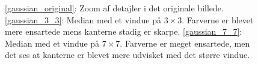 {\begin{figure}[!h]
    \centering
    \hspace{1em}
    \hspace{1em}
    \caption[]{\ref{gaussian_original}: Zoom af detajler i det originale
    billede. \ref{gaussian_3_3}: Median med et vindue på $3\times{}3$.
    Farverne er blevet mere ensartede mens kanterne stadig er skarpe.
    \ref{gaussian_7_7}: Median med et vindue på $7\times{}7$. Farverne er
    meget ensartede, men det ses at kanterne er blevet mere udvisket med
    det større vindue.}
    \label{gaussian_metode}
\end{figure}

}
